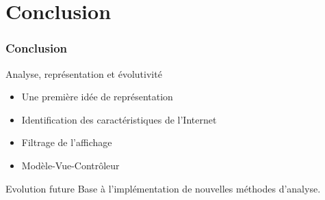 \section*{Conclusion}

\frame
{
\frametitle{Conclusion}

\begin{block}{Analyse, représentation et évolutivité}
 \begin{itemize}
 \item Une première idée de représentation
 \item Identification des caractéristiques de l'Internet
 \item Filtrage de l'affichage
 \item Modèle-Vue-Contrôleur
 \end{itemize}
\end{block}
\vfill
\begin{block}{Evolution future}
  Base à l'implémentation de nouvelles méthodes d'analyse.
\end{block}

 

}